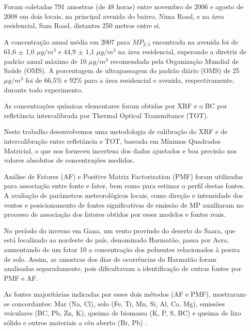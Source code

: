 Foram coletadas 791 amostras (de 48 horas) entre novembro de 2006 e 
agosto de 2008 em dois locais, na principal avenida do bairro, Nima Road, e na área 
residencial, Sam Road, distantes 250 metros entre si. 

A concentração anual média em 2007 para $MP_{2,5}$ encontrada na avenida 
foi de 61,6 $\pm$ 1,0 $\mu g/m^3$ e 44,9 $\pm$ 1,1 $\mu g/m^3$ na área residencial, 
superando a diretriz de padrão anual máximo de 10 $\mu g/m^3$ recomendada pela 
Organização Mundial de Saúde (OMS). A porcentagem de ultrapassagem 
do padrão diário (OMS) de 25 $\mu g/m^3$ foi de 66,5\% e 92\% para a área residencial e avenida, respectivamente, durante todo experimento. 

As concentrações químicas elementares foram obtidas por XRF e o BC por 
refletância intercalibrada por Thermal Optical Transmitance (TOT). 

Neste trabalho desenvolvemos uma metodologia de calibração do XRF 
e de intercalibração entre refletância e TOT, 
baseada em Mínimos Quadrados Matricial, o que nos forneceu 
incerteza dos dados ajustados e boa precisão nos valores 
absolutos de concentrações medidos.

Análise de Fatores (AF) e Positive Matrix Factorization (PMF) foram utilizadas
para associação entre fonte e fator, bem como para estimar o perfil destas fontes. 
A avaliação de parâmetros meteorológicos locais, como direção e intensidade 
dos ventos e posicionamento de fontes significativas de emissão de MP 
auxiliaram no processo de associação dos fatores obtidos por esses modelos e 
fontes reais. 

No período do inverno em Gana, um vento  
provindo do deserto do Saara, que está localizado ao nordeste do país, denominado Harmatão, 
passa por Acra, aumentando de um fator 10 a concentração dos poluentes 
relacionados à poeira de solo. Assim, as amostras dos dias de ocorrências 
do Harmatão foram analisadas separadamente, pois dificultavam a 
identificação de outras fontes por PMF e AF.

As fontes majoritárias indicadas por esses dois métodos (AF e PMF), 
mostraram-se concordantes: Mar (Na, Cl), solo (Fe, Ti, Mn, 
Si, Al, Ca, Mg), emissões veiculares (BC, Pb, Zn, K), queima de 
biomassa (K, P, S, BC) e queima de lixo sólido e outros materiais a céu aberto (Br, Pb) . 


